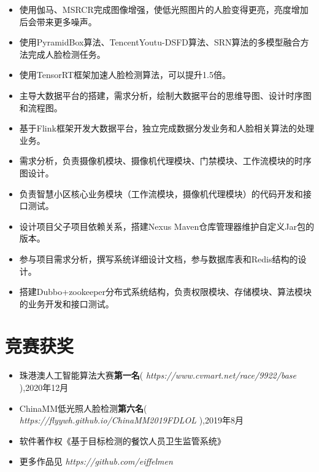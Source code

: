 \documentclass{resume}
\begin{document}
\begin{itemize}
  \item 使用伽马、MSRCR完成图像增强，使低光照图片的人脸变得更亮，亮度增加后会带来更多噪声。
  \item 使用PyramidBox算法、TencentYoutu-DSFD算法、SRN算法的多模型融合方法完成人脸检测任务。
  \item 使用TensorRT框架加速人脸检测算法，可以提升1.5倍。
\end{itemize}
\begin{itemize}
  \item 主导大数据平台的搭建，需求分析，绘制大数据平台的思维导图、设计时序图和流程图。
  \item 基于Flink框架开发大数据平台，独立完成数据分发业务和人脸相关算法的处理业务。
\end{itemize}
\begin{itemize}
  \item 需求分析，负责摄像机模块、摄像机代理模块、门禁模块、工作流模块的时序图设计。
  \item 负责智慧小区核心业务模块（工作流模块，摄像机代理模块）的代码开发和接口测试。
  \item 设计项目父子项目依赖关系，搭建Nexus Maven仓库管理器维护自定义Jar包的版本。
\end{itemize}
\begin{itemize}
  \item 参与项目需求分析，撰写系统详细设计文档，参与数据库表和Redis结构的设计。
  \item 搭建Dubbo+zookeeper分布式系统结构，负责权限模块、存储模块、算法模块的业务开发和接口测试。%
\end{itemize}


\section{竞赛获奖}
\begin{itemize}[parsep=0.2ex]
  \item 珠港澳人工智能算法大赛\textbf{第一名}( \textit{https://www.cvmart.net/race/9922/base} ),2020年12月  %
  \item ChinaMM低光照人脸检测\textbf{第六名}( \textit{https://flyywh.github.io/ChinaMM2019FDLOL} ),2019年8月
  \item 软件著作权《基于目标检测的餐饮人员卫生监管系统》
  \item 更多作品见 \textit{https://github.com/eiffelmen}
\end{itemize}
\end{document}
